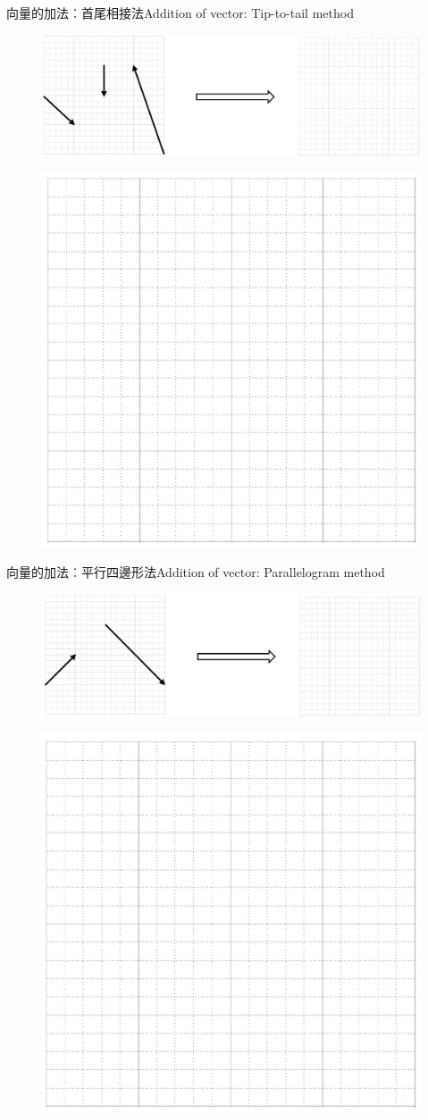 \documentclass[beamer=true]{standalone}
\begin{document}
\begin{frame}{向量的加法︰首尾相接法Addition of vector: Tip-to-tail method}
    \begin{figure}[h!]
        \centering
        \includegraphics[width=.9\textwidth]{../../assets/b696d9b0.png}
    \end{figure}
    \begin{figure}[h!]
        \centering
        \includegraphics[width=.3\textwidth]{../../assets/af91e6db.png}
    \end{figure}
\end{frame}
\begin{frame}{向量的加法︰平行四邊形法Addition of vector: Parallelogram method}
    \begin{figure}[h!]
        \centering
        \includegraphics[width=.9\textwidth]{../../assets/3cc60b5d.png}
    \end{figure}
    \begin{figure}[h!]
        \centering
        \includegraphics[width=.3\textwidth]{../../assets/45d03651.png}
    \end{figure}
\end{frame}
\end{document}
